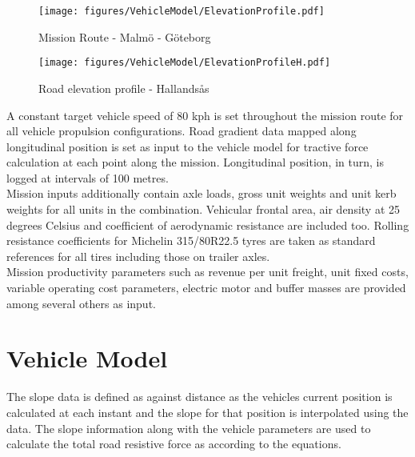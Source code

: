 \documentclass[MastersThesis.tex]{subfiles}
\begin{document}
\begin{figure}[ht!]
	\begin{center}
		\texttt{[image: figures/VehicleModel/ElevationProfile.pdf]}
	\end{center}
	\caption{Mission Route - Malm\"o - G\"oteborg}
	\label{MLMGBGElevation}
\end{figure} 


\begin{figure}[ht!]
	\begin{center}
		\texttt{[image: figures/VehicleModel/ElevationProfileH.pdf]}
	\end{center}
	\caption{Road elevation profile - Hallands\aa s}
	\label{Hallandas}
\end{figure} 

A constant target vehicle speed of 80 kph is set throughout the mission route for all vehicle propulsion configurations. Road gradient data mapped along longitudinal position is set as input to the vehicle model for tractive force calculation at each point along the mission. Longitudinal position, in turn, is logged at intervals of 100 metres.\\

Mission inputs additionally contain axle loads, gross unit weights and unit kerb weights for all units in the combination. Vehicular frontal area, air density at 25 degrees Celsius and coefficient of aerodynamic resistance are included too. Rolling resistance coefficients for Michelin 315/80R22.5 tyres are taken as standard references for all tires including those on trailer axles.\\

Mission productivity parameters such as revenue per unit freight, unit fixed costs, variable operating cost parameters, electric motor and buffer masses are provided among several others as input.\\

\section{Vehicle Model}
\label{sec:vehiclemodel}
The slope data is defined as against distance as the vehicles current position is calculated at each instant and the slope for that position is interpolated using the data. The slope information along with the vehicle parameters are used to calculate the total road resistive force as according to the equations.\\
\end{document}
